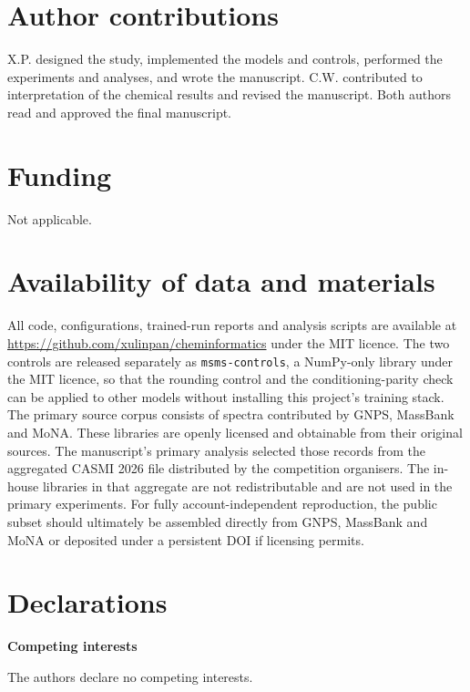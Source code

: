 \documentclass[11pt]{article}
\newcommand{\hd}[1]{\medskip\par\noindent\textbf{#1}\par\nobreak\vspace{2pt}\noindent\ignorespaces}
\begin{document}
\section*{Author contributions}
X.P. designed the study, implemented the models and controls, performed the experiments and analyses, and wrote the manuscript. C.W. contributed to interpretation of the chemical results and revised the manuscript. Both authors read and approved the final manuscript.

\section*{Funding}
Not applicable.

\section*{Availability of data and materials}
All code, configurations, trained-run reports and analysis scripts are available at \url{https://github.com/xulinpan/cheminformatics} under the MIT licence.
The two controls are released separately as \texttt{msms-controls}, a NumPy-only library under the MIT licence, so that the rounding control and the conditioning-parity check can be applied to other models without installing this project's training stack. The primary source corpus consists of spectra contributed by GNPS, MassBank and MoNA. These libraries are openly licensed and obtainable from their original sources. The manuscript's primary analysis selected those records from the aggregated CASMI 2026 file distributed by the competition organisers. The in-house libraries in that aggregate are not redistributable and are not used in the primary experiments. For fully account-independent reproduction, the public subset should ultimately be assembled directly from GNPS, MassBank and MoNA or deposited under a persistent DOI if licensing permits.

\section*{Declarations}
\hd{Competing interests} The authors declare no competing interests.
\end{document}
